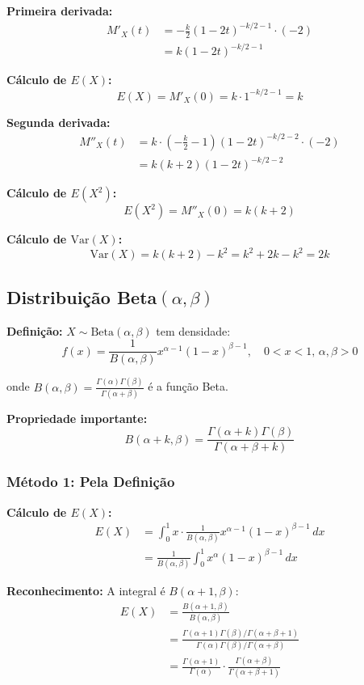 \documentclass[12pt,a4paper]{article}
\theoremstyle{plain}
\theoremstyle{definition}
\theoremstyle{remark}
\begin{document}
\textbf{Primeira derivada:}
\begin{align}
M'_X(t) &= -\frac{k}{2} (1-2t)^{-k/2-1} \cdot (-2) \\
&= k(1-2t)^{-k/2-1}
\end{align}

\textbf{Cálculo de \(E(X)\):}
\[
E(X) = M'_X(0) = k \cdot 1^{-k/2-1} = k
\]

\textbf{Segunda derivada:}
\begin{align}
M''_X(t) &= k \cdot \left(-\frac{k}{2}-1\right)(1-2t)^{-k/2-2} \cdot (-2) \\
&= k(k+2)(1-2t)^{-k/2-2}
\end{align}

\textbf{Cálculo de \(E(X^2)\):}
\[
E(X^2) = M''_X(0) = k(k+2)
\]

\textbf{Cálculo de \(\text{Var}(X)\):}
\[
\text{Var}(X) = k(k+2) - k^2 = k^2 + 2k - k^2 = 2k
\]

\subsection{Distribuição Beta\((\alpha, \beta)\)}

\textbf{Definição:} \(X \sim \text{Beta}(\alpha, \beta)\) tem densidade:
\[
f(x) = \frac{1}{B(\alpha, \beta)} x^{\alpha-1}(1-x)^{\beta-1}, \quad 0 < x < 1, \, \alpha, \beta > 0
\]

onde \(B(\alpha, \beta) = \frac{\Gamma(\alpha)\Gamma(\beta)}{\Gamma(\alpha+\beta)}\) é a função Beta.

\textbf{Propriedade importante:}
\[
B(\alpha+k, \beta) = \frac{\Gamma(\alpha+k)\Gamma(\beta)}{\Gamma(\alpha+\beta+k)}
\]

\subsubsection{Método 1: Pela Definição}

\textbf{Cálculo de \(E(X)\):}
\begin{align}
E(X) &= \int_0^1 x \cdot \frac{1}{B(\alpha, \beta)} x^{\alpha-1}(1-x)^{\beta-1} \, dx \\
&= \frac{1}{B(\alpha, \beta)} \int_0^1 x^\alpha (1-x)^{\beta-1} \, dx
\end{align}

\textbf{Reconhecimento:} A integral é \(B(\alpha+1, \beta)\):
\begin{align}
E(X) &= \frac{B(\alpha+1, \beta)}{B(\alpha, \beta)} \\
&= \frac{\Gamma(\alpha+1)\Gamma(\beta)/\Gamma(\alpha+\beta+1)}{\Gamma(\alpha)\Gamma(\beta)/\Gamma(\alpha+\beta)} \\
&= \frac{\Gamma(\alpha+1)}{\Gamma(\alpha)} \cdot \frac{\Gamma(\alpha+\beta)}{\Gamma(\alpha+\beta+1)}
\end{align}
\end{document}
